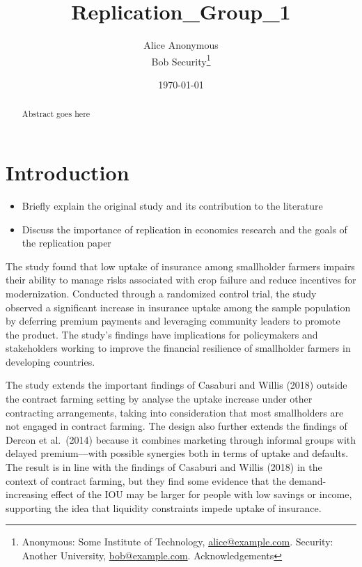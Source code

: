\documentclass[AER]{AEA}
\begin{document}
\title{Replication\_Group\_1}


\author{
  Alice Anonymous\\
  Bob Security\thanks{
  Anonymous: Some Institute of
Technology, \href{mailto:alice@example.com}{alice@example.com}.
  Security: Another
University, \href{mailto:bob@example.com}{bob@example.com}.
  Acknowledgements
}
}

\date{\today}

\begin{abstract}
Abstract goes here
\end{abstract}


\maketitle

\section{Introduction}

\begin{itemize}

\item  Briefly explain the original study and its contribution to the literature

\item  Discuss the importance of replication in economics research and the goals of the replication paper

\end{itemize}

The study found that low uptake of insurance among smallholder farmers
impairs their ability to manage risks associated with crop failure and
reduce incentives for modernization. Conducted through a randomized
control trial, the study observed a significant increase in insurance
uptake among the sample population by deferring premium payments and
leveraging community leaders to promote the product. The study's
findings have implications for policymakers and stakeholders working to
improve the financial resilience of smallholder farmers in developing
countries.

The study extends the important findings of Casaburi and Willis (2018)
outside the contract farming setting by analyse the uptake increase
under other contracting arrangements, taking into consideration that
most smallholders are not engaged in contract farming. The design also
further extends the findings of Dercon et al.~(2014) because it combines
marketing through informal groups with delayed premium---with possible
synergies both in terms of uptake and defaults. The result is in line
with the findings of Casaburi and Willis (2018) in the context of
contract farming, but they find some evidence that the demand-increasing
effect of the IOU may be larger for people with low savings or income,
supporting the idea that liquidity constraints impede uptake of
insurance.
\end{document}
